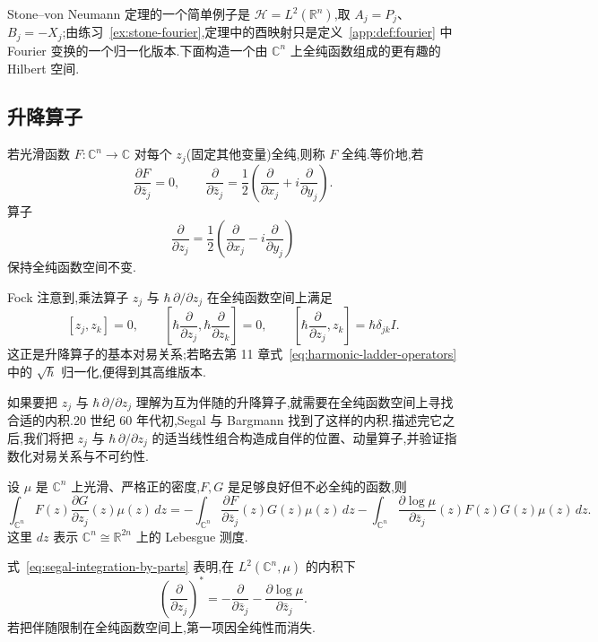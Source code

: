 Stone--von Neumann 定理的一个简单例子是 $\mathcal H=L^2(\mathbb R^n)$,取 $A_j=P_j$、$B_j=-X_j$;由练习~\ref{ex:stone-fourier},定理中的酉映射只是定义~\ref{app:def:fourier} 中 Fourier 变换的一个归一化版本.下面构造一个由 $\mathbb C^n$ 上全纯函数组成的更有趣的 Hilbert 空间.

\subsection{升降算子}
\label{subsec:segal-raising-lowering}

若光滑函数 $F:\mathbb C^n\to\mathbb C$ 对每个 $z_j$(固定其他变量)全纯,则称 $F$ 全纯.等价地,若
\[
\frac{\partial F}{\partial\bar z_j}=0,
\qquad
\frac{\partial}{\partial\bar z_j}=\frac12\left(\frac{\partial}{\partial x_j}+i\frac{\partial}{\partial y_j}\right).
\]
算子
\[
\frac{\partial}{\partial z_j}=\frac12\left(\frac{\partial}{\partial x_j}-i\frac{\partial}{\partial y_j}\right)
\]
保持全纯函数空间不变.

Fock 注意到,乘法算子 $z_j$ 与 $\hbar\,\partial/\partial z_j$ 在全纯函数空间上满足
\[
[z_j,z_k]=0,
\qquad
\left[\hbar\frac{\partial}{\partial z_j},\hbar\frac{\partial}{\partial z_k}\right]=0,
\qquad
\left[\hbar\frac{\partial}{\partial z_j},z_k\right]=\hbar\delta_{jk}I.
\label{eq:fock-commutation}
\]
这正是升降算子的基本对易关系;若略去第 11 章式~\eqref{eq:harmonic-ladder-operators} 中的 $\sqrt\hbar$ 归一化,便得到其高维版本.

如果要把 $z_j$ 与 $\hbar\,\partial/\partial z_j$ 理解为互为伴随的升降算子,就需要在全纯函数空间上寻找合适的内积.20 世纪 60 年代初,Segal 与 Bargmann 找到了这样的内积.描述完它之后,我们将把 $z_j$ 与 $\hbar\,\partial/\partial z_j$ 的适当线性组合构造成自伴的位置、动量算子,并验证指数化对易关系与不可约性.

\begin{lemma}[复空间上的分部积分]\label{lem:segal-integration-by-parts}
设 $\mu$ 是 $\mathbb C^n$ 上光滑、严格正的密度,$F,G$ 是足够良好但不必全纯的函数,则
\[
\int_{\mathbb C^n}F(z)\frac{\partial G}{\partial z_j}(z)\mu(z)\,dz
=-\int_{\mathbb C^n}\frac{\partial F}{\partial\bar z_j}(z)G(z)\mu(z)\,dz
-\int_{\mathbb C^n}\frac{\partial\log\mu}{\partial\bar z_j}(z)F(z)G(z)\mu(z)\,dz.
\label{eq:segal-integration-by-parts}
\]
这里 $dz$ 表示 $\mathbb C^n\cong\mathbb R^{2n}$ 上的 Lebesgue 测度.
\end{lemma}

式~\eqref{eq:segal-integration-by-parts} 表明,在 $L^2(\mathbb C^n,\mu)$ 的内积下
\[
\left(\frac{\partial}{\partial z_j}\right)^*
=-\frac{\partial}{\partial\bar z_j}-\frac{\partial\log\mu}{\partial\bar z_j}.
\]
若把伴随限制在全纯函数空间上,第一项因全纯性而消失.

